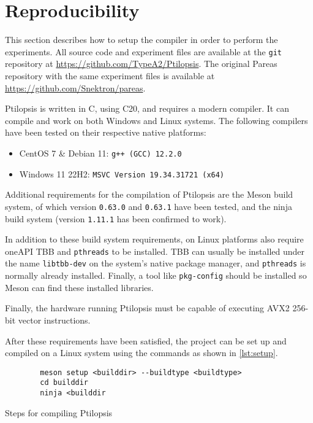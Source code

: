 \documentclass[11pt,dvipsnames]{article}
\newcommand{\mono}[1]{\texttt{#1}}
\newcommand{\Rplus}{\protect\hspace{-.1em}\protect\raisebox{.35ex}{\smaller{\smaller\textbf{+}}}}
\newcommand{\Cpp}{\mbox{C\Rplus\Rplus}\xspace}
\newcommand{\CppXX}{\mbox{C\Rplus\Rplus20}\xspace}
\begin{document}
\section{Reproducibility} \label{setup}
This section describes how to setup the compiler in order to perform the experiments. All source code and experiment files are available at the \mono{git} repository at \url{https://github.com/TypeA2/Ptilopsis}. The original Pareas repository with the same experiment files is available at \url{https://github.com/Snektron/pareas}.

Ptilopsis is written in \Cpp, using \CppXX, and requires a modern compiler. It can compile and work on both Windows and Linux systems. The following compilers have been tested on their respective native platforms:
\begin{itemize}
    \item CentOS 7 \& Debian 11: \mono{g++ (GCC) 12.2.0}
    \item Windows 11 22H2: \mono{MSVC Version 19.34.31721 (x64)}
\end{itemize}

Additional requirements for the compilation of Ptilopsis are the Meson build system, of which version \mono{0.63.0} and \mono{0.63.1} have been tested, and the ninja build system (version \mono{1.11.1} has been confirmed to work).

In addition to these build system requirements, on Linux platforms also require oneAPI TBB \cite{oneapi} and \mono{pthreads} to be installed. TBB can usually be installed under the name \mono{libtbb-dev} on the system's native package manager, and \mono{pthreads} is normally already installed. Finally, a tool like \mono{pkg-config} should be installed so Meson can find these installed libraries. 

Finally, the hardware running Ptilopsis must be capable of executing AVX2 256-bit vector instructions.

After these requirements have been satisfied, the project can be set up and compiled on a Linux system using the commands as shown in \autoref{lst:setup}.

\begin{listing}[h]
    \begin{verbatim}
        meson setup <builddir> --buildtype <buildtype>
        cd builddir
        ninja <builddir
    \end{verbatim}
    \caption{Steps for compiling Ptilopsis}
    \label{lst:setup}
\end{listing}
\end{document}
